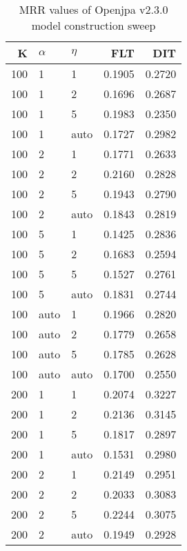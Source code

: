
\begin{table}
\begin{spacing}{1.2}
\centering
\caption{MRR values of Openjpa v2.3.0 model construction sweep}
\label{table:openjpa_model_sweep}
\vspace{0.2em}
\parbox{.45\linewidth}{\centering \begin{tabular}{rll|rr}
\toprule
   K & $\alpha$ &   $\eta$ & FLT & DIT \\
\midrule
 100 &     1 &     1 &           0.1905 & 0.2720 \\
 100 &     1 &     2 &           0.1696 & 0.2687 \\
 100 &     1 &     5 &           0.1983 & 0.2350 \\
 100 &     1 &  auto &           0.1727 & 0.2982 \\
 100 &     2 &     1 &           0.1771 & 0.2633 \\
 100 &     2 &     2 &           0.2160 & 0.2828 \\
 100 &     2 &     5 &           0.1943 & 0.2790 \\
 100 &     2 &  auto &           0.1843 & 0.2819 \\
 100 &     5 &     1 &           0.1425 & 0.2836 \\
 100 &     5 &     2 &           0.1683 & 0.2594 \\
 100 &     5 &     5 &           0.1527 & 0.2761 \\
 100 &     5 &  auto &           0.1831 & 0.2744 \\
 100 &  auto &     1 &           0.1966 & 0.2820 \\
 100 &  auto &     2 &           0.1779 & 0.2658 \\
 100 &  auto &     5 &           0.1785 & 0.2628 \\
 100 &  auto &  auto &           0.1700 & 0.2550 \\
 200 &     1 &     1 &           0.2074 & 0.3227 \\
 200 &     1 &     2 &           0.2136 & 0.3145 \\
 200 &     1 &     5 &           0.1817 & 0.2897 \\
 200 &     1 &  auto &           0.1531 & 0.2980 \\
 200 &     2 &     1 &           0.2149 & 0.2951 \\
 200 &     2 &     2 &           0.2033 & 0.3083 \\
 200 &     2 &     5 &           0.2244 & 0.3075 \\
 200 &     2 &  auto &           0.1949 & 0.2928 \\

\end{tabular}}
\end{spacing}
\end{table}
